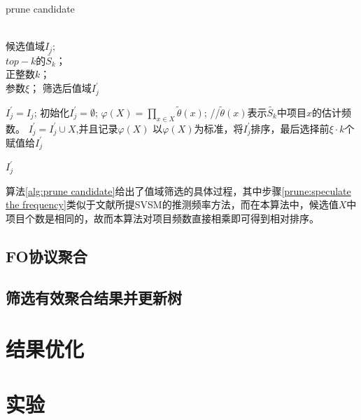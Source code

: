 \documentclass[UTF8]{ctexart}
\begin{document}
\begin{algorithm}[h]
\caption{prune candidate}
\label{alg:prune candidate}
\begin{algorithmic}[1]
\REQUIRE ~~\\
候选值域$I_{j}$;\\
$top-k$的$\tilde{S_k}$；\\
正整数$k$；\\
参数$\xi$；
\ENSURE 筛选后值域$I^{\prime}_{j}$

    \STATE $I^{\prime}_{j} = I_{j}$;
\ELSE
    \STATE 初始化$I^{\prime}_{j} = \emptyset$;
        \STATE $\varphi(X)=\prod_{x \in X} \tilde{\theta}(x)$;    //$\tilde{\theta}(x)$表示$\tilde{S_k}$中项目$x$的估计频数。\label{prune:speculate the frequency}
        \STATE $I^{\prime}_{j} = I^{\prime}_{j} \cup X$,并且记录$\varphi(X)$
    \ENDFOR
    \STATE 以$\varphi(X)$为标准，将$I^{\prime}_{j}$排序，最后选择前$\xi \cdot k$个赋值给$I^{\prime}_{j}$
\ENDIF

\RETURN $I^{\prime}_{j}$
\end{algorithmic}
\end{algorithm}

算法\ref{alg:prune candidate}给出了值域筛选的具体过程，其中步骤\ref{prune:speculate the frequency}类似于文献\cite{wang2018locally}所提SVSM的推测频率方法，而在本算法中，候选值$X$中项目个数是相同的，故而本算法对项目频数直接相乘即可得到相对排序。

\subsection{FO协议聚合}

\subsection{筛选有效聚合结果并更新树}


\section{结果优化}
\label{section:optimize}

\section{实验}
\end{document}
